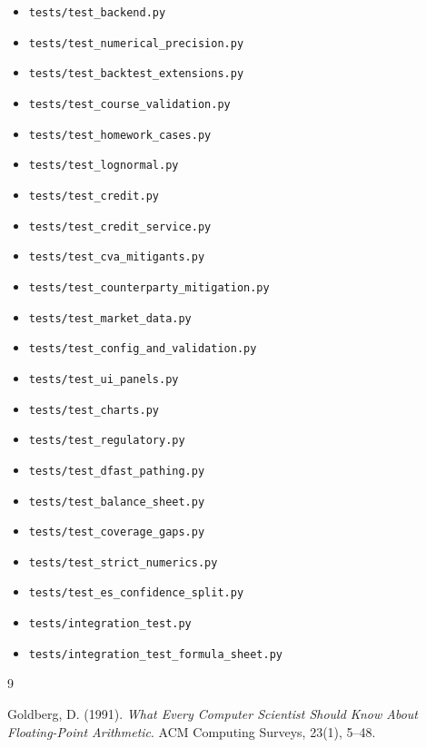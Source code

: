\documentclass[11pt]{article}
\newcommand{\code}[1]{\texttt{#1}}
\begin{document}
\begin{itemize}
  \item \code{tests/test\_backend.py}
  \item \code{tests/test\_numerical\_precision.py}
  \item \code{tests/test\_backtest\_extensions.py}
  \item \code{tests/test\_course\_validation.py}
  \item \code{tests/test\_homework\_cases.py}
  \item \code{tests/test\_lognormal.py}
  \item \code{tests/test\_credit.py}
  \item \code{tests/test\_credit\_service.py}
  \item \code{tests/test\_cva\_mitigants.py}
  \item \code{tests/test\_counterparty\_mitigation.py}
  \item \code{tests/test\_market\_data.py}
  \item \code{tests/test\_config\_and\_validation.py}
  \item \code{tests/test\_ui\_panels.py}
  \item \code{tests/test\_charts.py}
  \item \code{tests/test\_regulatory.py}
  \item \code{tests/test\_dfast\_pathing.py}
  \item \code{tests/test\_balance\_sheet.py}
  \item \code{tests/test\_coverage\_gaps.py}
  \item \code{tests/test\_strict\_numerics.py}
  \item \code{tests/test\_es\_confidence\_split.py}
  \item \code{tests/integration\_test.py}
  \item \code{tests/integration\_test\_formula\_sheet.py}
\end{itemize}

\begin{thebibliography}{9}

Goldberg, D. (1991).
\textit{What Every Computer Scientist Should Know About Floating-Point Arithmetic}.
ACM Computing Surveys, 23(1), 5--48.

\end{thebibliography}
\end{document}
